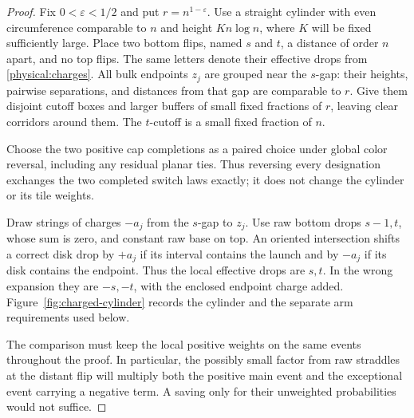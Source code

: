 \begin{proof}
Fix \(0<\varepsilon<1/2\) and put \(r=n^{1-\varepsilon}\).
Use a straight cylinder with even circumference comparable to \(n\)
and height \(Kn\log n\), where \(K\) will be fixed sufficiently
large. Place two bottom flips, named \(s\) and \(t\), a distance
of order \(n\) apart, and no top flips. The same letters denote
their effective drops from \eqref{physical:charges}. All bulk
endpoints \(z_j\) are grouped near the \(s\)-gap: their heights,
pairwise separations, and distances from that gap are comparable to
\(r\). Give them disjoint cutoff boxes and larger buffers of small
fixed fractions of \(r\), leaving clear corridors around them.
The \(t\)-cutoff is a small fixed fraction of \(n\).

Choose the two positive cap completions as a paired choice under
global color reversal, including any residual planar ties. Thus
reversing every designation exchanges the two completed switch laws
exactly; it does not change the cylinder or its tile weights.

Draw strings of charges \(-a_j\) from the \(s\)-gap to \(z_j\).
Use raw bottom drops \(s-1,t\), whose sum is zero, and constant
raw base on top. An oriented intersection shifts a correct disk
drop by \(+a_j\) if its interval contains the launch and by
\(-a_j\) if its disk contains the endpoint. Thus the local
effective drops are \(s,t\). In the wrong expansion they are
\(-s,-t\), with the enclosed endpoint charge added.
Figure~\ref{fig:charged-cylinder} records the cylinder and the
separate arm requirements used below.

The comparison must keep the local positive weights on the same
events throughout the proof. In particular, the possibly small factor
from raw straddles at the distant flip will multiply both the positive
main event and the exceptional event carrying a negative term. A
saving only for their unweighted probabilities would not suffice.




\end{proof}
